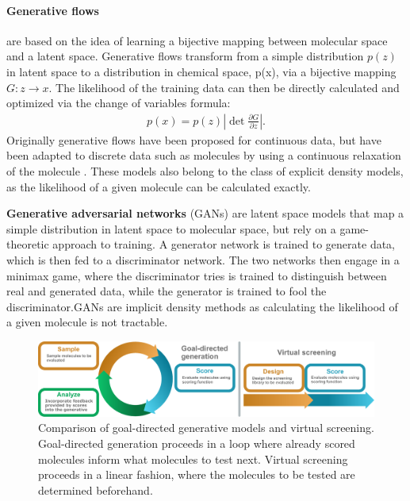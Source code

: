 \paragraph{Generative flows} \citep{rezendeVariationalInferenceNormalizing2016} are based on the idea of learning a bijective mapping between molecular
space and a latent space. Generative flows transform from a simple distribution $p(z)$ in latent space
to a distribution in chemical space, p(x), via a bijective mapping $G: z \rightarrow x$.
The likelihood of the training data can then be directly calculated and optimized
via the change of variables formula:
\begin{align}
      p(x) = p(z) \left| \det \frac{\partial G}{\partial z} \right|.
\end{align}
Originally generative flows have been proposed for continuous data, but have been adapted to
discrete data such as molecules by using a continuous relaxation of the molecule
\citep{madhawaGraphNVPInvertibleFlow2019}. These models also belong to the class of explicit density
models, as the likelihood of a given molecule can be calculated exactly.

\textbf{Generative adversarial networks} (GANs) \citep{goodfellowGenerativeAdversarialNetworks2014}
are latent space models that map a simple distribution in latent space to molecular space, but rely
on a game-theoretic approach to training. A generator network is trained to generate data, which is
then fed to a discriminator network. The two networks then engage in a minimax game, where the
discriminator tries is trained to distinguish between real and generated data, while the generator
is trained to fool the discriminator.\@ \acp{GAN} are implicit density methods as calculating the
likelihood of a given molecule is not tractable.


\begin{figure}
      \centering
      \includegraphics[width=\textwidth]{./figures/goal_directed_cycle_and_virtual_screening.pdf}
      \caption{Comparison of goal-directed generative models and virtual screening. Goal-directed
            generation proceeds in a loop where already scored molecules inform what molecules to
            test next. Virtual screening proceeds in a linear fashion, where the molecules to be
            tested are determined beforehand. }
\end{figure}


